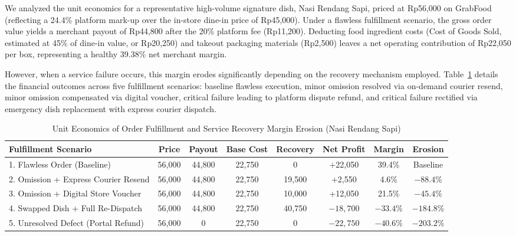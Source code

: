 \documentclass{jomas}
\begin{document}
We analyzed the unit economics for a representative high-volume signature dish, Nasi Rendang Sapi, priced at Rp56,000 on GrabFood (reflecting a 24.4\% platform mark-up over the in-store dine-in price of Rp45,000). Under a flawless fulfillment scenario, the gross order value yields a merchant payout of Rp44,800 after the 20\% platform fee (Rp11,200). Deducting food ingredient costs (Cost of Goods Sold, estimated at 45\% of dine-in value, or Rp20,250) and takeout packaging materials (Rp2,500) leaves a net operating contribution of Rp22,050 per box, representing a healthy 39.38\% net merchant margin.

However, when a service failure occurs, this margin erodes significantly depending on the recovery mechanism employed. Table~\ref{tab:unit-economics} details the financial outcomes across five fulfillment scenarios: baseline flawless execution, minor omission resolved via on-demand courier resend, minor omission compensated via digital voucher, critical failure leading to platform dispute refund, and critical failure rectified via emergency dish replacement with express courier dispatch.

\begin{table}[H]
\caption{Unit Economics of Order Fulfillment and Service Recovery Margin Erosion (Nasi Rendang Sapi)}
\label{tab:unit-economics}
\centering
\small
\setlength{\tabcolsep}{3.8pt}
\begin{tabularx}{\textwidth}{l c c c c c c c}
\toprule
\textbf{Fulfillment Scenario} & \textbf{Price} & \textbf{Payout} & \textbf{Base Cost} & \textbf{Recovery} & \textbf{Net Profit} & \textbf{Margin} & \textbf{Erosion} \\
\midrule
1. Flawless Order (Baseline) & 56,000 & 44,800 & 22,750 & 0 & +22,050 & 39.4\% & Baseline \\
2. Omission + Express Courier Resend & 56,000 & 44,800 & 22,750 & 19,500 & +2,550 & 4.6\% & $-88.4\%$ \\
3. Omission + Digital Store Voucher & 56,000 & 44,800 & 22,750 & 10,000 & +12,050 & 21.5\% & $-45.4\%$ \\
4. Swapped Dish + Full Re-Dispatch & 56,000 & 44,800 & 22,750 & 40,750 & $-18,700$ & $-33.4\%$ & $-184.8\%$ \\
5. Unresolved Defect (Portal Refund) & 56,000 & 0 & 22,750 & 0 & $-22,750$ & $-40.6\%$ & $-203.2\%$ \\
\bottomrule
\end{tabularx}
\end{table}
\end{document}
